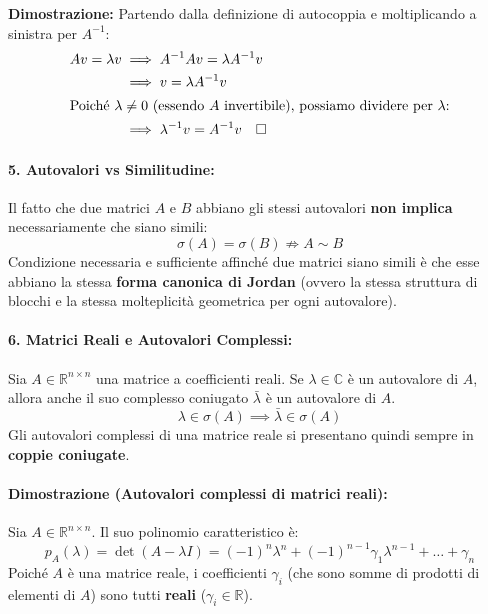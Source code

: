 \documentclass[a4paper,12pt]{article}
\begin{document}
	\medskip
	\noindent \textbf{Dimostrazione:}
	Partendo dalla definizione di autocoppia e moltiplicando a sinistra per $A^{-1}$:
	\begin{align*}
		Av = \lambda v &\implies A^{-1}Av = \lambda A^{-1}v \\
		&\implies v = \lambda A^{-1}v \\
		\intertext{Poiché $\lambda \neq 0$ (essendo $A$ invertibile), possiamo dividere per $\lambda$:}
		&\implies \lambda^{-1} v = A^{-1} v \quad \square
	\end{align*}
	\paragraph{5. Autovalori vs Similitudine:}
	Il fatto che due matrici $A$ e $B$ abbiano gli stessi autovalori \textbf{non implica} necessariamente che siano simili:
	\begin{equation*}
		\sigma(A) = \sigma(B) \not\Rightarrow A \sim B
	\end{equation*}
	Condizione necessaria e sufficiente affinché due matrici siano simili è che esse abbiano la stessa \textbf{forma canonica di Jordan} (ovvero la stessa struttura di blocchi e la stessa molteplicità geometrica per ogni autovalore).
	
	\paragraph{6. Matrici Reali e Autovalori Complessi:}
	Sia $A \in \mathbb{R}^{n \times n}$ una matrice a coefficienti reali. Se $\lambda \in \mathbb{C}$ è un autovalore di $A$, allora anche il suo complesso coniugato $\bar{\lambda}$ è un autovalore di $A$.
	\begin{equation}
		\lambda \in \sigma(A) \implies \bar{\lambda} \in \sigma(A)
	\end{equation}
	Gli autovalori complessi di una matrice reale si presentano quindi sempre in \textbf{coppie coniugate}.
	\paragraph{Dimostrazione (Autovalori complessi di matrici reali):}
	Sia $A \in \mathbb{R}^{n \times n}$. Il suo polinomio caratteristico è:
	\begin{equation*}
		p_A(\lambda) = \det(A - \lambda I) = (-1)^n \lambda^n + (-1)^{n-1} \gamma_1 \lambda^{n-1} + \dots + \gamma_n
	\end{equation*}
	Poiché $A$ è una matrice reale, i coefficienti $\gamma_i$ (che sono somme di prodotti di elementi di $A$) sono tutti \textbf{reali} ($\gamma_i \in \mathbb{R}$). 
	
\end{document}
